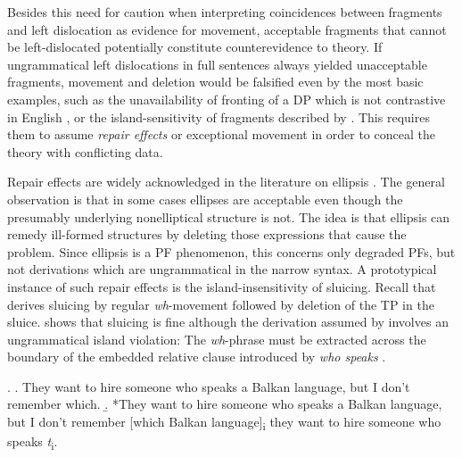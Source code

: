 Besides this need for caution when interpreting coincidences between fragments and left dislocation as evidence for movement, acceptable fragments that cannot be left-dislocated potentially constitute counterevidence to  theory. If ungrammatical left dislocations in full sentences always yielded unacceptable fragments, movement and deletion would be falsified even by the most basic examples, such as the unavailability of fronting of a DP which is not contrastive in English \citep{weir2014}, or the island-sensitivity of fragments described by \citet{merchant2004}. This requires them to assume \textit{repair effects} \citep{merchant2004} or exceptional movement \citep{weir2014} in order to conceal the theory with conflicting data.

Repair effects are widely acknowledged in the literature on ellipsis \citep[see e.g.][]{fox.lasnik2003, merchant2008, muller2011, lasnik2015}. The general observation is that in some cases ellipses are acceptable even though the presumably underlying nonelliptical structure is not. The idea is that ellipsis can remedy ill-formed structures by deleting those expressions that cause the problem. Since ellipsis is a PF phenomenon, this concerns only degraded PFs, but not derivations which are ungrammatical in the narrow syntax. A prototypical instance of such repair effects is the island-insensitivity of sluicing. Recall that \citet{merchant2001} derives sluicing by regular \textit{wh}-movement followed by deletion of the TP in the sluice. \Next[a] shows that sluicing is fine although the derivation assumed by \citeauthor{merchant2004} involves an ungrammatical island violation: The \textit{wh}-phrase must be extracted across the boundary of the embedded relative clause introduced by \textit{who speaks} \Next[b].

\newpage
\ex. \a. They want to hire someone who speaks a Balkan language, but I don't remember which. \hfill\citep[705]{merchant2004}
 \b. *They want to hire someone who speaks a Balkan language, but I don't remember [which Balkan language]\textsubscript{i} they want to hire someone who speaks \textit{t}\textsubscript{i}.
 
